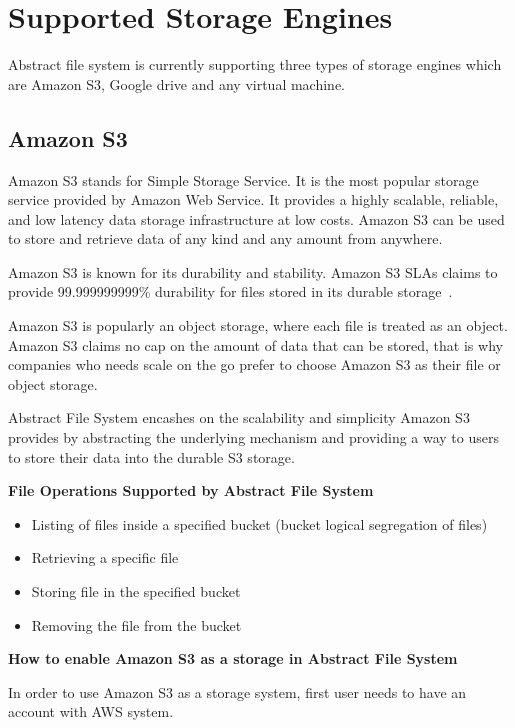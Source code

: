 \section{Supported Storage Engines}
Abstract file system is currently supporting three types of storage engines
which are Amazon S3, Google drive and any virtual machine.

\subsection{Amazon S3}

Amazon S3 stands for Simple Storage Service. It is the most popular storage
service provided by Amazon Web Service. It provides a highly scalable,
reliable, and low latency data storage infrastructure at low costs. Amazon S3
can be used to store and retrieve data of any kind and any amount from 
anywhere.


Amazon S3 is known for its durability and stability. Amazon S3 SLAs claims to
provide 99.999999999\% durability for files stored in its durable 
storage~\cite{hid-sp18-420-amazon-S3}.


Amazon S3 is popularly an object storage, where each file is treated as an
object. Amazon S3 claims no cap on the amount of data that can be stored, that
is why companies who needs scale on the go prefer to choose Amazon S3 as their
file or object storage.


Abstract File System encashes on the scalability and simplicity Amazon S3
provides by abstracting the underlying mechanism and providing a way to users
to store their data into the durable S3 storage.


\textbf{File Operations Supported by Abstract File System}


\begin{itemize}
    \item   Listing of files inside a specified bucket (bucket logical
segregation of files)
    \item       Retrieving a specific file
    \item       Storing file in  the specified bucket
    \item       Removing the file from the bucket
\end{itemize}



\textbf{How to enable Amazon S3 as a storage in Abstract File System}


In order to use Amazon S3 as a storage system, first user needs to have an
account with AWS system.


